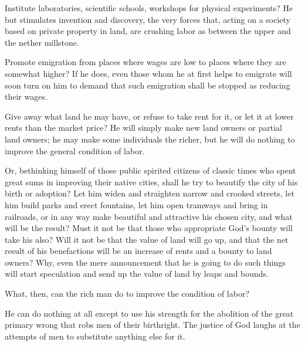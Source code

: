\documentclass{book}
\begin{document}
Institute laboratories, scientific schools, workshops for physical experiments? He but stimulates invention and discovery, the very forces that, acting on a society based on private property in land, are crushing labor as between the upper and the nether millstone.

Promote emigration from places where wages are low to places where they are somewhat higher? If he does, even those whom he at first helps to emigrate will soon turn on him to demand that such emigration shall be stopped as reducing their wages.

Give away what land he may have, or refuse to take rent for it, or let it at lower rents than the market price? He will simply make new land owners or partial land owners; he may make some individuals the richer, but he will do nothing to improve the general condition of labor.

Or, bethinking himself of those public spirited citizens of classic times who spent great sums in improving their native cities, shall he try to beautify the city of his birth or adoption? Let him widen and straighten narrow and crooked streets, let him build parks and erect fountains, let him open tramways and bring in railroads, or in any way make beautiful and attractive his chosen city, and what will be the result? Must it not be that those who appropriate God’s bounty will take his also? Will it not be that the value of land will go up, and that the net result of his benefactions will be an increase of rents and a bounty to land owners? Why, even the mere announcement that he is going to do such things will start speculation and send up the value of land by leaps and bounds.

What, then, can the rich man do to improve the condition of labor?

He can do nothing at all except to use his strength for the abolition of the great primary wrong that robs men of their birthright. The justice of God laughs at the attempts of men to substitute anything else for it.
\end{document}
